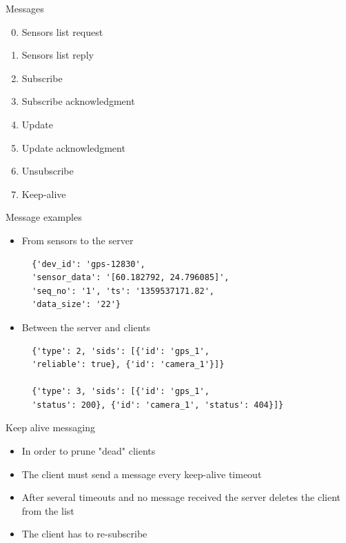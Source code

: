 \documentclass{beamer}
\begin{document}
\begin{frame}{Messages}
 \begin{enumerate}
   \setcounter{enumi}{-1}
   \item  Sensors list request
   \item  Sensors list reply
   \item  Subscribe 
   \item  Subscribe acknowledgment
   \item  Update 
   \item  Update acknowledgment
   \item  Unsubscribe
   \item  Keep-alive
 \end{enumerate}
\end{frame}


\begin{frame}[fragile]{Message examples}
  \begin{itemize}

    \item From sensors to the server
       \begin{verbatim}
  {'dev_id': 'gps-12830',
  'sensor_data': '[60.182792, 24.796085]',
  'seq_no': '1', 'ts': '1359537171.82', 
  'data_size': '22'}  
       \end{verbatim}

    \item Between the server and clients
       \begin{verbatim}
  {'type': 2, 'sids': [{'id': 'gps_1', 
  'reliable': true}, {'id': 'camera_1'}]}

  {'type': 3, 'sids': [{'id': 'gps_1',
  'status': 200}, {'id': 'camera_1', 'status': 404}]}
       \end{verbatim}
  \end{itemize}
\end{frame}


\begin{frame}{Keep alive messaging}
  \begin{itemize}
     \item In order to prune "dead" clients
     \item The client must send a message every keep-alive timeout
     \item After several timeouts and no message received the server
           deletes the client from the list
     \item The client has to re-subscribe
  \end{itemize}
\end{frame}
\end{document}
